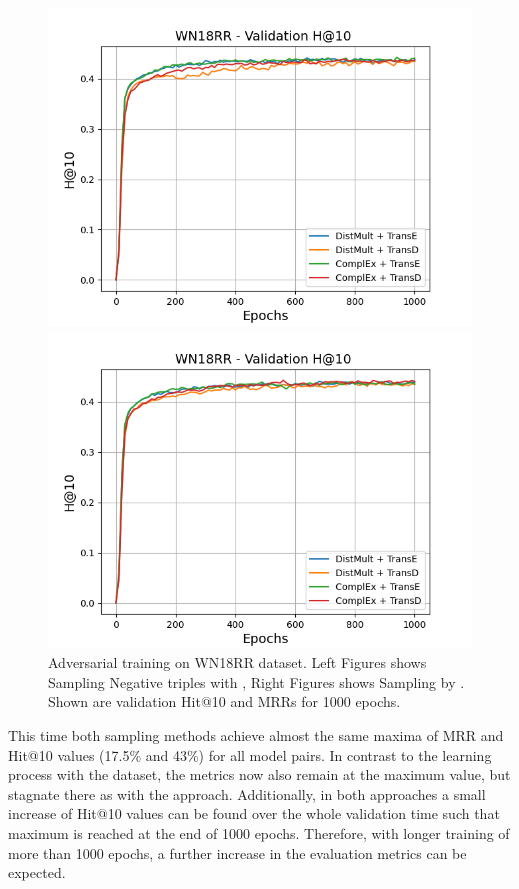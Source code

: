 \begin{figure}
\begin{minipage}{.5\textwidth}
    \end{minipage}
    \begin{minipage}{.5\textwidth}
      \centering
      \includegraphics[width=0.9\linewidth]{figures/results/gan_train/not_pretrained/uncertainty/max/entropy/wn18rr/1k_epochs/uncertainty_wn18rr_hit10.png}
    \end{minipage}%
    \begin{minipage}{.5\textwidth}
      \centering
      \includegraphics[width=0.9\linewidth]{figures/results/gan_train/not_pretrained/uncertainty/max_distribution/entropy/wn18rr/1k_epochs/uncertainty_wn18rr_hit10.png}
    \end{minipage}%
    \caption{Adversarial training on \textsc{WN18RR} dataset. 
    Left Figures shows Sampling Negative triples with \usmax, Right Figures shows Sampling by \ussoftmax.
    Shown are validation Hit@10 and MRRs for 1000 epochs.}
    \label{fig:advtrain_wn18rr_usmax_ussoftmax}
\end{figure}
This time both sampling methods achieve almost the same maxima of MRR and Hit@10 values (17.5\% and 43\%) for all model pairs.
In contrast to the learning process with the \umls dataset, the metrics now also \usmax remain at the maximum value, but stagnate there as with the \ussoftmax approach.
Additionally, in both approaches a small increase of Hit@10 values can be found over the whole validation time such that maximum is reached at the end of 1000 epochs.
Therefore, with longer training of more than 1000 epochs, a further increase in the evaluation metrics can be expected.

